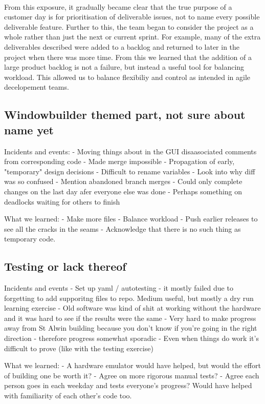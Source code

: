 \documentclass{l3proj}
\begin{document}
\\
From this exposure, it gradually became clear that the true purpose of a customer day is for prioritisation of deliverable issues, not to name every possible deliverable feature. Further to this, the team began to consider the project as a whole rather than just the next or current sprint. For example, many of the extra deliverables described were added to a backlog and returned to later in the project when there was more time. From this we learned that the addition of a large product backlog is not a failure, but instead a useful tool for balancing workload. This allowed us to balance flexibiliy and control as intended in agile decelopement teams\cite{rising}.
\subsection{Windowbuilder themed part, not sure about name yet}

Incidents and events:
- Moving things about in the GUI disaasociated comments from corresponding code
- Made merge impossible
- Propagation of early, "temporary" design decisions
- Difficult to rename variables
- Look into why diff was so confused
- Mention abandoned branch merges
- Could only complete changes on the last day afer everyone else was done
- Perhaps something on deadlocks waiting for others to finish

What we learned:
- Make more files
- Balance workload
- Push earlier releases to see all the cracks in the seams
- Acknowledge that there is no such thing as temporary code.

\subsection{Testing or lack thereof}

Incidents and events
- Set up yaml / autotesting - it mostly failed due to forgetting to add supporitng files to repo. Medium useful, but mostly a dry run learning exercise
- Old software was kind of shit at working without the hardware and it was hard to see if the results were the same
- Very hard to make progress away from St Alwin building because you don't know if you're going in the right direction - therefore progress somewhat sporadic
- Even when things do work it's difficult to prove (like with the testing exercise)

What we learned:
- A hardware emulator would have helped, but would the effort of building one be worth it?
- Agree on more rigorous manual tests?
- Agree each person goes in each weekday and tests everyone's progress? Would have helped with familiarity of each other's code too.
\end{document}
